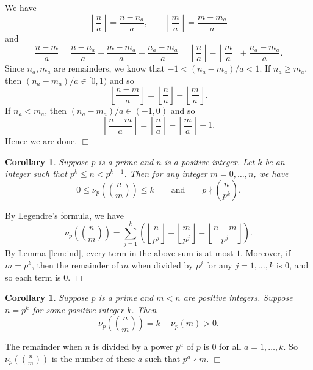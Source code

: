 \documentclass{article}
\newtheorem{cor}[subsection]{Corollary}
\newenvironment{proof}{\noindent {\bf Proof:}}{$\Box$ \vspace{2 ex}}
\begin{document}
\begin{proof}
    We have
    $$\left\lfloor\frac{n}{a}\right\rfloor = \frac{n-n_a}{a},\qquad\left\lfloor\frac{m}{a}\right\rfloor = \frac{m-m_a}{a}$$ and $$\frac{n-m}{a} = \frac{n-n_a}{a} - \frac{m-m_a}{a} + \frac{n_a-m_a}{a} = \left\lfloor\frac{n}{a}\right\rfloor - \left\lfloor\frac{m}{a}\right\rfloor+ \frac{n_a-m_a}{a}.$$
    Since $n_a,m_a$ are remainders, we know that $-1 < (n_a-m_a)/a < 1$. If $n_a\geq m_a$, then $(n_a-m_a)/a \in [0,1)$ and so $$\left\lfloor\frac{n-m}{a}\right\rfloor = \left\lfloor\frac{n}{a}\right\rfloor - \left\lfloor\frac{m}{a}\right\rfloor.$$
    If $n_a < m_a$, then $(n_a-m_a)/a \in (-1,0)$ and so $$\left\lfloor\frac{n-m}{a}\right\rfloor = \left\lfloor\frac{n}{a}\right\rfloor - \left\lfloor\frac{m}{a}\right\rfloor - 1.$$
    Hence we are done.
\end{proof}

\begin{cor}\label{cor:notdiv}
    Suppose $p$ is a prime and $n$ is a positive integer. Let $k$ be an integer such that $p^k\leq n < p^{k+1}$. Then for any integer $m=0,\ldots,n$, we have
    $$0\leq \nu_p\left(\binom{n}{m}\right) \leq k\qquad\mbox{and}\qquad p\nmid \binom{n}{p^k}.$$
\end{cor}

\begin{proof}
    By Legendre's formula, we have
    $$\nu_p\left(\binom{n}{m}\right) = \sum_{j=1}^k \left(\left\lfloor\frac{n}{p^j}\right\rfloor - \left\lfloor\frac{m}{p^j}\right\rfloor - \left\lfloor\frac{n-m}{p^j}\right\rfloor\right).$$
    By Lemma \ref{lem:ind}, every term in the above sum is at most $1$. Moreover, if $m = p^k$, then the remainder of $m$ when divided by $p^j$ for any $j = 1,\ldots,k$ is $0$, and so each term is $0$.
\end{proof}

\begin{cor}\label{cor:ndivp}
    Suppose $p$ is a prime and $m<n$ are positive integers. Suppose $n = p^k$ for some positive integer $k$. Then
    $$\nu_p\left(\binom{n}{m}\right) = k - \nu_p(m) > 0.$$
\end{cor}

\begin{proof}
    The remainder when $n$ is divided by a power $p^a$ of $p$ is $0$ for all $a = 1,\ldots,k$. So $\nu_p\left(\binom{n}{m}\right)$ is the number of these $a$ such that $p^a\nmid m$.
\end{proof}
\end{document}
